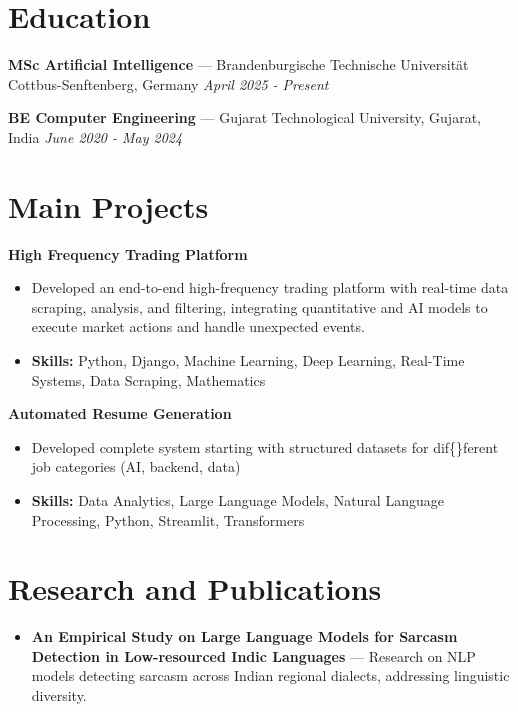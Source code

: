 \documentclass[a4paper,10pt]{article}
\begin{document}
\section*{Education}
\textbf{MSc Artificial Intelligence} — Brandenburgische Technische Universität Cottbus-Senftenberg, Germany \hfill \textit{April 2025 - Present}\par
\vspace{1.5pt}
\textbf{BE Computer Engineering} — Gujarat Technological University, Gujarat, India \hfill \textit{June 2020 - May 2024}\par

\section*{Main Projects}
\textbf{High Frequency Trading Platform}\par
\vspace{1pt}
\begin{itemize}
  \item Developed an end-to-end high-frequency trading platform with real-time data scraping, analysis, and filtering, integrating quantitative and AI models to execute market actions and handle unexpected events.
  \item \textbf{Skills:} Python, Django, Machine Learning, Deep Learning, Real-Time Systems, Data Scraping, Mathematics
\end{itemize}
\vspace{3pt}
\textbf{Automated Resume Generation}\par
\vspace{1pt}
\begin{itemize}
  \item Developed complete system starting with structured datasets for dif\{\}ferent job categories (AI, backend, data)
  \item \textbf{Skills:} Data Analytics, Large Language Models, Natural Language Processing, Python, Streamlit, Transformers
\end{itemize}

\section*{Research and Publications}
\begin{itemize}
\item \textbf{An Empirical Study on Large Language Models for Sarcasm Detection in Low-resourced Indic Languages} — Research on NLP models detecting sarcasm across Indian regional dialects, addressing linguistic diversity.
\end{itemize}
\end{document}
